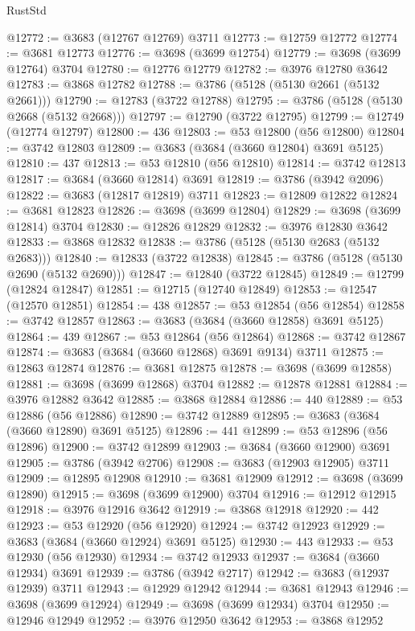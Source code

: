 \begin{lexlean}{RustStd}
\begin{coremodule}
@12772 := @3683 (@12767 @12769) @3711
@12773 := @12759 @12772
@12774 := @3681 @12773
@12776 := @3698 (@3699 @12754)
@12779 := @3698 (@3699 @12764) @3704
@12780 := @12776 @12779
@12782 := @3976 @12780 @3642
@12783 := @3868 @12782
@12788 := @3786 (@5128 (@5130 @2661 (@5132 @2661)))
@12790 := @12783 (@3722 @12788)
@12795 := @3786 (@5128 (@5130 @2668 (@5132 @2668)))
@12797 := @12790 (@3722 @12795)
@12799 := @12749 (@12774 @12797)
@12800 := 436
@12803 := @53 @12800 (@56 @12800)
@12804 := @3742 @12803
@12809 := @3683 (@3684 (@3660 @12804) @3691 @5125)
@12810 := 437
@12813 := @53 @12810 (@56 @12810)
@12814 := @3742 @12813
@12817 := @3684 (@3660 @12814) @3691
@12819 := @3786 (@3942 @2096)
@12822 := @3683 (@12817 @12819) @3711
@12823 := @12809 @12822
@12824 := @3681 @12823
@12826 := @3698 (@3699 @12804)
@12829 := @3698 (@3699 @12814) @3704
@12830 := @12826 @12829
@12832 := @3976 @12830 @3642
@12833 := @3868 @12832
@12838 := @3786 (@5128 (@5130 @2683 (@5132 @2683)))
@12840 := @12833 (@3722 @12838)
@12845 := @3786 (@5128 (@5130 @2690 (@5132 @2690)))
@12847 := @12840 (@3722 @12845)
@12849 := @12799 (@12824 @12847)
@12851 := @12715 (@12740 @12849)
@12853 := @12547 (@12570 @12851)
@12854 := 438
@12857 := @53 @12854 (@56 @12854)
@12858 := @3742 @12857
@12863 := @3683 (@3684 (@3660 @12858) @3691 @5125)
@12864 := 439
@12867 := @53 @12864 (@56 @12864)
@12868 := @3742 @12867
@12874 := @3683 (@3684 (@3660 @12868) @3691 @9134) @3711
@12875 := @12863 @12874
@12876 := @3681 @12875
@12878 := @3698 (@3699 @12858)
@12881 := @3698 (@3699 @12868) @3704
@12882 := @12878 @12881
@12884 := @3976 @12882 @3642
@12885 := @3868 @12884
@12886 := 440
@12889 := @53 @12886 (@56 @12886)
@12890 := @3742 @12889
@12895 := @3683 (@3684 (@3660 @12890) @3691 @5125)
@12896 := 441
@12899 := @53 @12896 (@56 @12896)
@12900 := @3742 @12899
@12903 := @3684 (@3660 @12900) @3691
@12905 := @3786 (@3942 @2706)
@12908 := @3683 (@12903 @12905) @3711
@12909 := @12895 @12908
@12910 := @3681 @12909
@12912 := @3698 (@3699 @12890)
@12915 := @3698 (@3699 @12900) @3704
@12916 := @12912 @12915
@12918 := @3976 @12916 @3642
@12919 := @3868 @12918
@12920 := 442
@12923 := @53 @12920 (@56 @12920)
@12924 := @3742 @12923
@12929 := @3683 (@3684 (@3660 @12924) @3691 @5125)
@12930 := 443
@12933 := @53 @12930 (@56 @12930)
@12934 := @3742 @12933
@12937 := @3684 (@3660 @12934) @3691
@12939 := @3786 (@3942 @2717)
@12942 := @3683 (@12937 @12939) @3711
@12943 := @12929 @12942
@12944 := @3681 @12943
@12946 := @3698 (@3699 @12924)
@12949 := @3698 (@3699 @12934) @3704
@12950 := @12946 @12949
@12952 := @3976 @12950 @3642
@12953 := @3868 @12952

\end{coremodule}
\end{lexlean}

